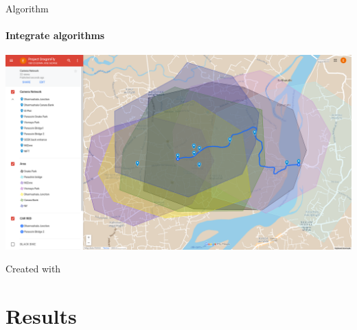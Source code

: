 \documentclass{beamer}
\newcommand{\link}[2]{\href{#1}{\textit{\color{blue}{#2}}}}%
\begin{document}
	\begin{frame}{Algorithm}
		\framesubtitle{Integrate algorithms}
		\begin{center}
			\includegraphics[height=0.7\textheight]{res/camera_network_demo.png}
		\end{center}
		Created with \link{https://www.google.com/maps/d/edit?mid=1s2ST5x4nn-EK3JqU-c9EEGASRq5Ini0&usp=sharing}{Google Maps}
	\end{frame}
	
	



	\section{Results}
\end{document}
